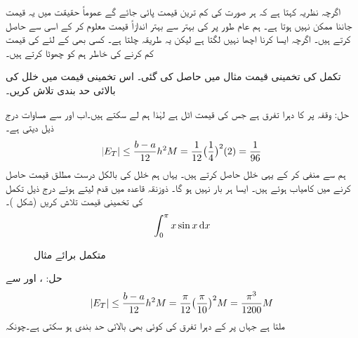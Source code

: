 اگرچہ نظریہ کہتا ہے کہ ہر صورت  کی کم ترین قیمت پائی جائے گے عموماً حقیقت میں یہ قیمت جاننا ممکن نہیں ہوتا ہے۔ ہم عام طور پر  کی بہتر سے بہتر اندازاً قیمت معلوم کر کے اسی سے  حاصل کرتے ہیں۔ اگرچہ ایسا کرنا اچھا نہیں لگتا ہے لیکن یہ طریقہ چلتا ہے۔  کسی بھی  کے لئے  کی قیمت کم کرنے کی خاطر ہم  کو چھوٹا کرتے ہیں۔ 

تکمل  کی تخمینی قیمت مثال  میں حاصل کی گئی۔ اس تخمینی قیمت میں خلل کی بالائی حد بندی تلاش کریں۔

حل:\quad
وقفہ  پر  کا دہرا تفرق  ہے جس کی قیمت اٹل ہے لہٰذا ہم  لے سکتے ہیں۔اب  اور  سے مساوات  درج ذیل دیتی ہے۔ 
\begin{align*}
\abs{E_T}\le \frac{b-a}{12}h^2M=\frac{1}{12}\big(\frac{1}{4}\big)^2(2)=\frac{1}{96}
\end{align*}
ہم  سے  منفی کر کے یہی خلل
  حاصل کرتے ہیں۔ یہاں ہم خلل کی بالکل درست مطلق قیمت حاصل کرنے میں کامیاب ہوئے ہیں۔ ایسا ہر بار نہیں ہو گا۔
ذوزنقہ قاعدہ میں  قدم لیتے ہوئے درج ذیل تکمل کی تخمینی قیمت تلاش کریں (شکل )۔
\begin{align*}
\int_0^{\pi}x\sin x\dif x
\end{align*}
%
\begin{figure}
\centering
{}
\caption{متکمل برائے مثال }
\label{شکل_مثال_تکمل_خلل_درکار}
\end{figure}
حل:\quad
{}،  اور  سے
\begin{align*}
\abs{E_T}\le \frac{b-a}{12}h^2M=\frac{\pi}{12}\big(\frac{\pi}{10}\big)^2M=\frac{\pi^3}{1200}M
\end{align*}
ملتا ہے جہاں  پر  کے دہرا تفرق کی کوئی بھی بالائی حد بندی ہو سکتی ہے۔چونکہ
